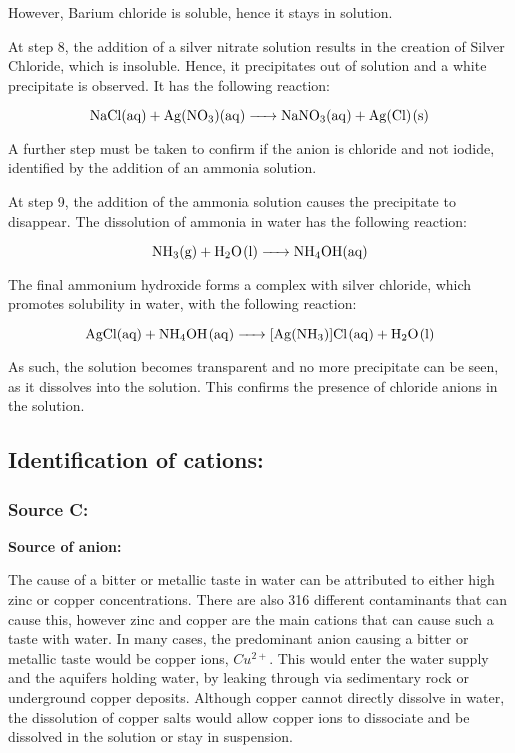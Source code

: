\documentclass[11pt, a4]{article}
\begin{document}
					However, Barium chloride is soluble, hence it stays in solution. 

					At step 8, the addition of a silver nitrate solution results in the creation of Silver Chloride, which is insoluble. Hence, it precipitates out of solution and a white precipitate is observed. It has the following reaction:

					\begin{equation}
						\ce{NaCl{(aq)} + Ag(NO_3)(aq) -> NaNO3(aq) + Ag(Cl)(s)}
					\end{equation}

					A further step must be taken to confirm if the anion is chloride and not iodide, identified by the addition of an ammonia solution.
					
					At step 9, the addition of the ammonia solution causes the precipitate to disappear. The dissolution of ammonia in water has the following reaction:

					\begin{equation}
						\ce{NH_3{(g)} + H_2O(l) -> NH_4OH{(aq)}}
					\end{equation}

					The final ammonium hydroxide forms a complex with silver chloride, which promotes solubility in water, with the following reaction:

					\begin{equation}
						\ce{AgCl{(aq)} + NH_4OH(aq) -> [Ag(NH_3)]Cl(aq) + H_2O(l)}
					\end{equation}
					
					As such, the solution becomes transparent and no more precipitate can be seen, as it dissolves into the solution. This confirms the presence of chloride anions in the solution.

		\subsection{Identification of cations:}
		
			\subsubsection{Source C:}
							
			\textbf{Source of anion:}

			The cause of a bitter or metallic taste in water can be attributed to either high zinc or copper concentrations. There are also 316 different contaminants that can cause this, however zinc and copper are the main cations that can cause such a taste with water. In many cases, the predominant anion causing a bitter or metallic taste would be copper ions, $Cu^{2+}$. This would enter the water supply and the aquifers holding water, by leaking through via sedimentary rock or underground copper deposits. Although copper cannot directly dissolve in water, the dissolution of copper salts would allow copper ions to dissociate and be dissolved in the solution or stay in suspension.
\end{document}
